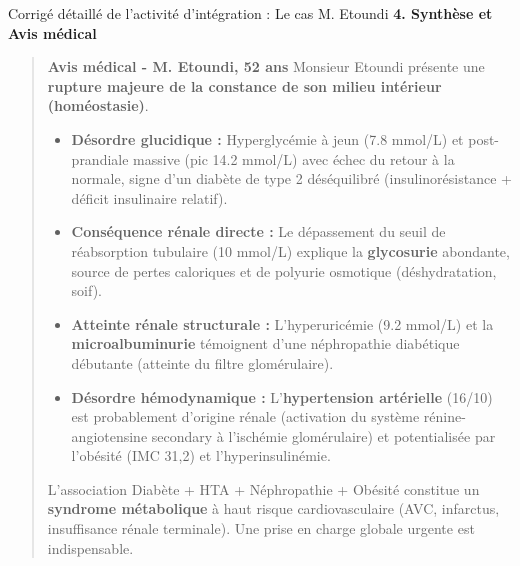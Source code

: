 \documentclass[11pt]{article}
\begin{document}
\begin{exoresolu}{Corrigé détaillé de l'activité d'intégration : Le cas M. Etoundi}
\textbf{4. Synthèse et Avis médical}
\begin{quote}
\textbf{Avis médical - M. Etoundi, 52 ans}
Monsieur Etoundi présente une \textbf{rupture majeure de la constance de son milieu intérieur (homéostasie)}.
\begin{itemize}
    \item \textbf{Désordre glucidique :} Hyperglycémie à jeun (\num{7,8} mmol/L) et post-prandiale massive (pic \num{14,2} mmol/L) avec échec du retour à la normale, signe d'un diabète de type 2 déséquilibré (insulinorésistance + déficit insulinaire relatif).
    \item \textbf{Conséquence rénale directe :} Le dépassement du seuil de réabsorption tubulaire (\num{10} mmol/L) explique la \textbf{glycosurie} abondante, source de pertes caloriques et de polyurie osmotique (déshydratation, soif).
    \item \textbf{Atteinte rénale structurale :} L'hyperuricémie (\num{9,2} mmol/L) et la \textbf{microalbuminurie} témoignent d'une néphropathie diabétique débutante (atteinte du filtre glomérulaire).
    \item \textbf{Désordre hémodynamique :} L'\textbf{hypertension artérielle} (16/10) est probablement d'origine rénale (activation du système rénine-angiotensine secondary à l'ischémie glomérulaire) et potentialisée par l'obésité (IMC 31,2) et l'hyperinsulinémie.
\end{itemize}
L'association Diabète + HTA + Néphropathie + Obésité constitue un \textbf{syndrome métabolique} à haut risque cardiovasculaire (AVC, infarctus, insuffisance rénale terminale). Une prise en charge globale urgente est indispensable.
\end{quote}


\end{exoresolu}
\end{document}
